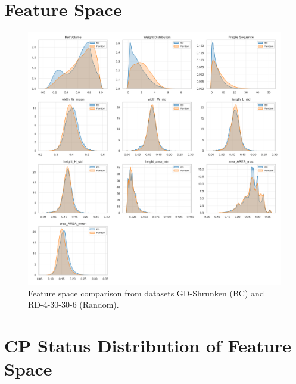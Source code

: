 \section{Feature Space}
\label{app:sec:feature_space}
\begin{figure}[!ht]
	\centering
	\includegraphics[width=\textwidth]{pictures/dataset_structure/featureSpace_random_BC.png}
	\caption{Feature space comparison from datasets GD-Shrunken (BC) and RD-4-30-30-6 (Random).}
	\label{fig:feature_space}
\end{figure}
\clearpage

\section{CP Status Distribution of Feature Space}
\label{app:sec:feature_space_cpStatus}

